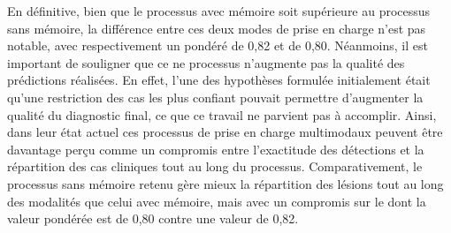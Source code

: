 En définitive, bien que le processus avec mémoire soit supérieure au processus sans mémoire, la différence entre ces deux modes de prise en charge n'est pas notable, avec respectivement un \fscore{} pondéré de 0,82 et de 0,80. Néanmoins, il est important de souligner que ce ne processus n'augmente pas la qualité des prédictions réalisées. En effet, l'une des hypothèses formulée initialement était qu'une restriction des cas les plus confiant pouvait permettre d'augmenter la qualité du diagnostic final, ce que ce travail ne parvient pas à accomplir. Ainsi, dans leur état actuel ces processus de prise en charge multimodaux peuvent être davantage perçu comme un compromis entre l'exactitude des détections et la répartition des cas cliniques tout au long du processus. Comparativement, le processus sans mémoire retenu gère mieux la répartition des lésions tout au long des modalités que celui avec mémoire, mais avec un compromis sur le \fscore{} dont la valeur pondérée est de 0,80 contre une valeur de 0,82.\par

